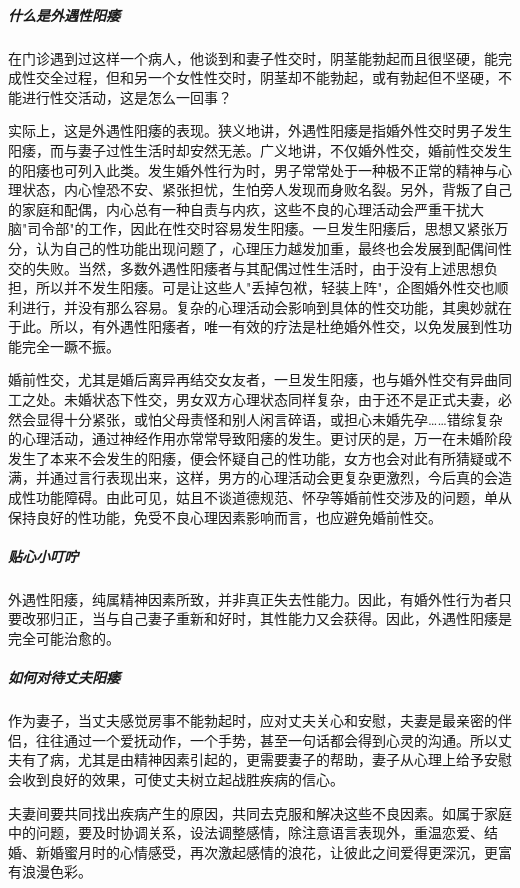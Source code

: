 \begin{enumerate}
\subparagraph{什么是外遇性阳痿}

在门诊遇到过这样一个病人，他谈到和妻子性交时，阴茎能勃起而且很坚硬，能完成性交全过程，但和另一个女性性交时，阴茎却不能勃起，或有勃起但不坚硬，不能进行性交活动，这是怎么一回事？

实际上，这是外遇性阳痿的表现。狭义地讲，外遇性阳痿是指婚外性交时男子发生阳痿，而与妻子过性生活时却安然无恙。广义地讲，不仅婚外性交，婚前性交发生的阳痿也可列入此类。发生婚外性行为时，男子常常处于一种极不正常的精神与心理状态，内心惶恐不安、紧张担忧，生怕旁人发现而身败名裂。另外，背叛了自己的家庭和配偶，内心总有一种自责与内疚，这些不良的心理活动会严重干扰大脑"司令部"的工作，因此在性交时容易发生阳痿。一旦发生阳痿后，思想又紧张万分，认为自己的性功能出现问题了，心理压力越发加重，最终也会发展到配偶间性交的失败。当然，多数外遇性阳痿者与其配偶过性生活时，由于没有上述思想负担，所以并不发生阳痿。可是让这些人"丢掉包袱，轻装上阵"，企图婚外性交也顺利进行，并没有那么容易。复杂的心理活动会影响到具体的性交功能，其奥妙就在于此。所以，有外遇性阳痿者，唯一有效的疗法是杜绝婚外性交，以免发展到性功能完全一蹶不振。

婚前性交，尤其是婚后离异再结交女友者，一旦发生阳痿，也与婚外性交有异曲同工之处。未婚状态下性交，男女双方心理状态同样复杂，由于还不是正式夫妻，必然会显得十分紧张，或怕父母责怪和别人闲言碎语，或担心未婚先孕……错综复杂的心理活动，通过神经作用亦常常导致阳痿的发生。更讨厌的是，万一在未婚阶段发生了本来不会发生的阳痿，便会怀疑自己的性功能，女方也会对此有所猜疑或不满，并通过言行表现出来，这样，男方的心理活动会更复杂更激烈，今后真的会造成性功能障碍。由此可见，姑且不谈道德规范、怀孕等婚前性交涉及的问题，单从保持良好的性功能，免受不良心理因素影响而言，也应避免婚前性交。

\subparagraph{贴心小叮咛}

外遇性阳痿，纯属精神因素所致，并非真正失去性能力。因此，有婚外性行为者只要改邪归正，当与自己妻子重新和好时，其性能力又会获得。因此，外遇性阳痿是完全可能治愈的。

\subparagraph{如何对待丈夫阳痿}

作为妻子，当丈夫感觉房事不能勃起时，应对丈夫关心和安慰，夫妻是最亲密的伴侣，往往通过一个爱抚动作，一个手势，甚至一句话都会得到心灵的沟通。所以丈夫有了病，尤其是由精神因素引起的，更需要妻子的帮助，妻子从心理上给予安慰会收到良好的效果，可使丈夫树立起战胜疾病的信心。

夫妻间要共同找出疾病产生的原因，共同去克服和解决这些不良因素。如属于家庭中的问题，要及时协调关系，设法调整感情，除注意语言表现外，重温恋爱、结婚、新婚蜜月时的心情感受，再次激起感情的浪花，让彼此之间爱得更深沉，更富有浪漫色彩。


\end{enumerate}
